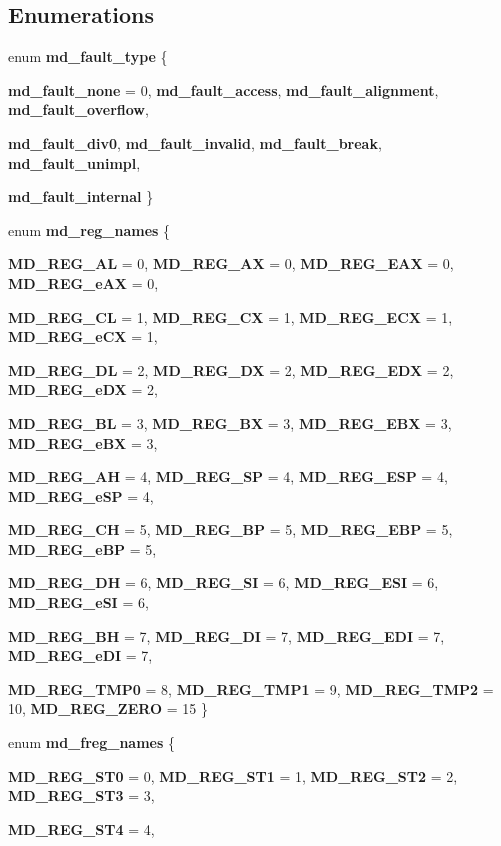 \subsection*{Enumerations}
\begin{CompactItemize}
\item 
enum {\bf md\_\-fault\_\-type} \{ \par
{\bf md\_\-fault\_\-none} =  0, 
{\bf md\_\-fault\_\-access}, 
{\bf md\_\-fault\_\-alignment}, 
{\bf md\_\-fault\_\-overflow}, 
\par
{\bf md\_\-fault\_\-div0}, 
{\bf md\_\-fault\_\-invalid}, 
{\bf md\_\-fault\_\-break}, 
{\bf md\_\-fault\_\-unimpl}, 
\par
{\bf md\_\-fault\_\-internal}
 \}
\item 
enum {\bf md\_\-reg\_\-names} \{ \par
{\bf MD\_\-REG\_\-AL} =  0, 
{\bf MD\_\-REG\_\-AX} =  0, 
{\bf MD\_\-REG\_\-EAX} =  0, 
{\bf MD\_\-REG\_\-eAX} =  0, 
\par
{\bf MD\_\-REG\_\-CL} =  1, 
{\bf MD\_\-REG\_\-CX} =  1, 
{\bf MD\_\-REG\_\-ECX} =  1, 
{\bf MD\_\-REG\_\-eCX} =  1, 
\par
{\bf MD\_\-REG\_\-DL} =  2, 
{\bf MD\_\-REG\_\-DX} =  2, 
{\bf MD\_\-REG\_\-EDX} =  2, 
{\bf MD\_\-REG\_\-eDX} =  2, 
\par
{\bf MD\_\-REG\_\-BL} =  3, 
{\bf MD\_\-REG\_\-BX} =  3, 
{\bf MD\_\-REG\_\-EBX} =  3, 
{\bf MD\_\-REG\_\-eBX} =  3, 
\par
{\bf MD\_\-REG\_\-AH} =  4, 
{\bf MD\_\-REG\_\-SP} =  4, 
{\bf MD\_\-REG\_\-ESP} =  4, 
{\bf MD\_\-REG\_\-eSP} =  4, 
\par
{\bf MD\_\-REG\_\-CH} =  5, 
{\bf MD\_\-REG\_\-BP} =  5, 
{\bf MD\_\-REG\_\-EBP} =  5, 
{\bf MD\_\-REG\_\-eBP} =  5, 
\par
{\bf MD\_\-REG\_\-DH} =  6, 
{\bf MD\_\-REG\_\-SI} =  6, 
{\bf MD\_\-REG\_\-ESI} =  6, 
{\bf MD\_\-REG\_\-eSI} =  6, 
\par
{\bf MD\_\-REG\_\-BH} =  7, 
{\bf MD\_\-REG\_\-DI} =  7, 
{\bf MD\_\-REG\_\-EDI} =  7, 
{\bf MD\_\-REG\_\-eDI} =  7, 
\par
{\bf MD\_\-REG\_\-TMP0} =  8, 
{\bf MD\_\-REG\_\-TMP1} =  9, 
{\bf MD\_\-REG\_\-TMP2} =  10, 
{\bf MD\_\-REG\_\-ZERO} =  15
 \}
\item 
enum {\bf md\_\-freg\_\-names} \{ \par
{\bf MD\_\-REG\_\-ST0} =  0, 
{\bf MD\_\-REG\_\-ST1} =  1, 
{\bf MD\_\-REG\_\-ST2} =  2, 
{\bf MD\_\-REG\_\-ST3} =  3, 
\par
{\bf MD\_\-REG\_\-ST4} =  4, 

\end{CompactItemize}
